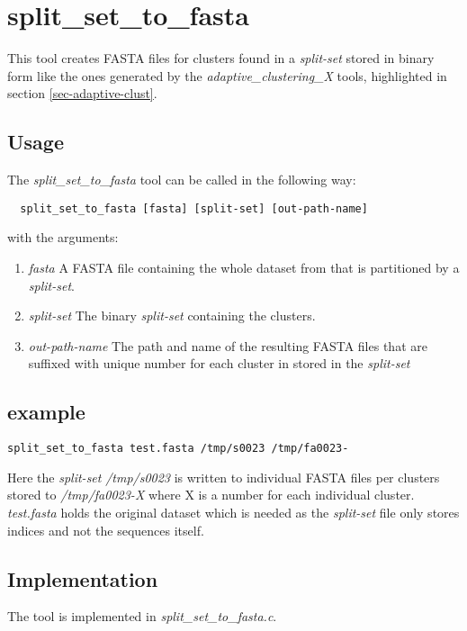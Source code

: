 \section{split\_set\_to\_fasta} \label{sec-sstofasta}

This tool creates FASTA files for clusters found in a \emph{split-set}
stored in binary form like the ones generated by the
\emph{adaptive\_clustering\_X} tools, highlighted in section
\ref{sec-adaptive-clust}.

\subsection{Usage}
The \emph{split\_set\_to\_fasta} tool can be called in the following way:
\begin{lstlisting}
  split_set_to_fasta [fasta] [split-set] [out-path-name]
\end{lstlisting}
with the arguments:
\begin{enumerate}
  \item \emph{fasta} A FASTA file containing the whole dataset from
    that is partitioned by a \emph{split-set}.
  \item \emph{split-set} The binary \emph{split-set} containing the
    clusters.
  \item \emph{out-path-name} The path and name of the resulting FASTA
    files that are suffixed with unique number for each cluster in
    stored in the \emph{split-set}
\end{enumerate}

\subsection{example}
\begin{lstlisting}
split_set_to_fasta test.fasta /tmp/s0023 /tmp/fa0023-
\end{lstlisting}
Here the \emph{split-set} \emph{/tmp/s0023} is written to individual
FASTA files per clusters stored to
\emph{/tmp/fa0023-X} where X is a number for each individual cluster.
\emph{test.fasta} holds the original dataset
which is needed as the \emph{split-set} file only stores indices and
not the sequences itself.

\subsection{Implementation}
The tool is implemented in \emph{split\_set\_to\_fasta.c}. 
